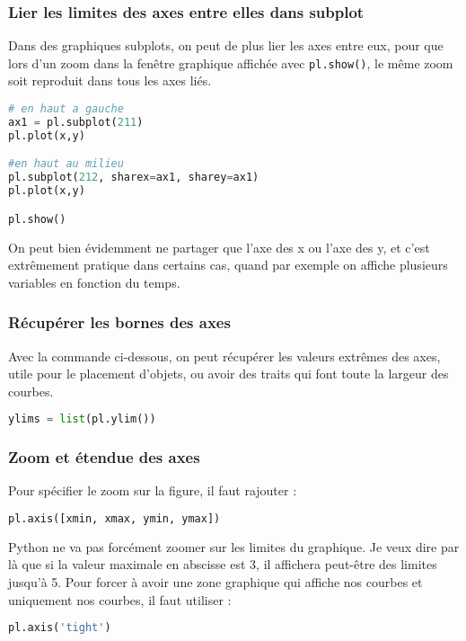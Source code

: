 \documentclass[a4paper,twoside]{article}
\begin{document}
\subsubsection{Lier les limites des axes entre elles dans subplot}
Dans des graphiques subplots, on peut de plus lier les axes entre eux, pour que lors d'un zoom dans la fenêtre graphique affichée avec \texttt{pl.show()}, le même zoom soit reproduit dans tous les axes liés.

\begin{lstlisting}[language=python]
# en haut a gauche
ax1 = pl.subplot(211)
pl.plot(x,y)

#en haut au milieu
pl.subplot(212, sharex=ax1, sharey=ax1)
pl.plot(x,y)

pl.show()
\end{lstlisting}

\begin{remarque}
On peut bien évidemment ne partager que l'axe des x ou l'axe des y, et c'est extrêmement pratique dans certains cas, quand par exemple on affiche plusieurs variables en fonction du temps.
\end{remarque}

\subsubsection{Récupérer les bornes des axes}
Avec la commande ci-dessous, on peut récupérer les valeurs extrêmes des axes, utile pour le placement d'objets, ou avoir des traits qui font toute la largeur des courbes.
\begin{lstlisting}[language=python]
ylims = list(pl.ylim())
\end{lstlisting}

\subsubsection{Zoom et étendue des axes}

Pour spécifier le zoom sur la figure, il faut rajouter :
\begin{lstlisting}[language=python]
pl.axis([xmin, xmax, ymin, ymax])
\end{lstlisting}

Python ne va pas forcément zoomer sur les limites du graphique. Je veux dire par là que si la valeur maximale en abscisse est 3, il affichera peut-être des limites jusqu'à 5. Pour forcer à avoir une zone graphique qui affiche nos courbes et uniquement nos courbes, il faut utiliser :
\begin{lstlisting}[language=python]
pl.axis('tight')
\end{lstlisting}
\end{document}
